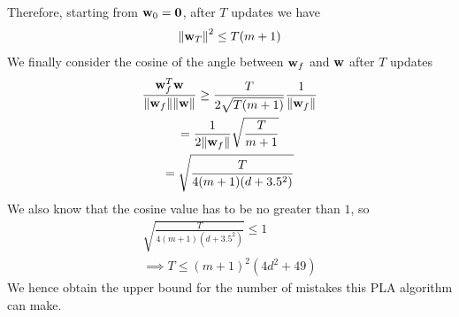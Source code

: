 \documentclass[11pt]{article}
\theoremstyle{definition}
\begin{document}
Therefore, starting from $\vb{w}_0 = \vb{0}$, after $T$ updates we have 
\[
  \norm{\vb{w}_T}^2 \leq T(m + 1)
\]
We finally consider the cosine of the angle between $\vb{w}_f$ and $\vb{w}$ after $T$ updates
\begin{gather*}
  \frac{\vb{w}_f^T\vb{w}}{\norm{\vb{w}_f}\norm{\vb{w}}} \geq \frac{T}{2\sqrt{T(m+1)}}\frac{1}{\norm{\vb{w}_f}} \\ 
  = \frac{1}{2\norm{\vb{w}_f}}\sqrt{\frac{T}{m+1}} \\
  = \sqrt{\frac{T}{4(m + 1)(d + 3.5^2)}}
\end{gather*}
We also know that the cosine value has to be no greater than $1$, so 
\begin{gather*}
  \sqrt{\frac{T}{4(m + 1)(d + 3.5^2)}} \leq 1 \\ 
  \implies T \leq (m + 1)^2(4d^2 + 49)
\end{gather*}
We hence obtain the upper bound for the number of mistakes this PLA algorithm can make.
\newpage
\end{document}
